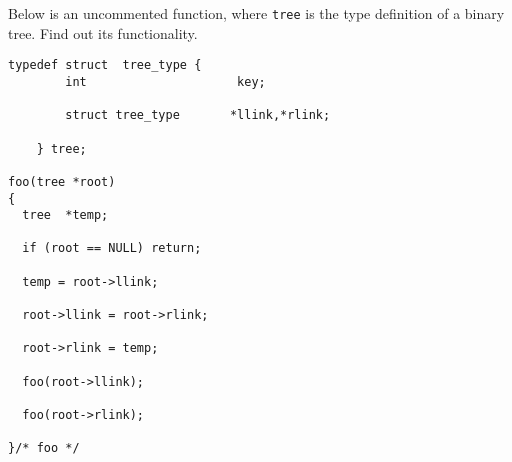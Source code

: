 Below is an uncommented function, where {\tt tree} is the type
definition of a binary tree. Find out its functionality.

\begin{verbatim}
typedef	struct	tree_type {
        int                     key;

        struct tree_type       *llink,*rlink;

	} tree;

foo(tree *root)
{
  tree	*temp;

  if (root == NULL) return;

  temp = root->llink;

  root->llink = root->rlink;

  root->rlink = temp;

  foo(root->llink);

  foo(root->rlink);

}/* foo */
\end{verbatim}
